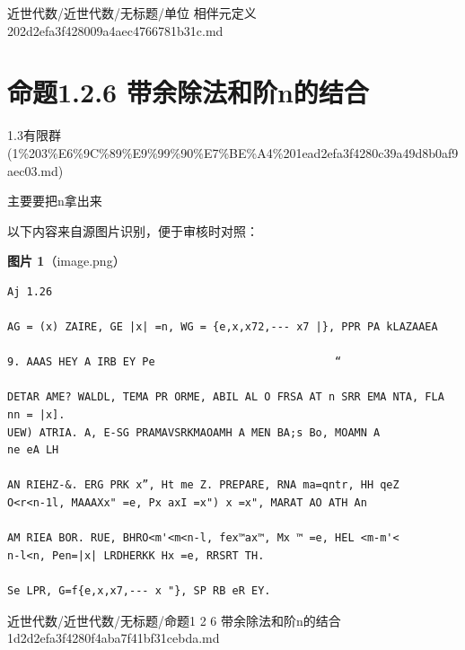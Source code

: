\begin{note}[来源路径]

近世代数/近世代数/无标题/单位 相伴元定义 202d2efa3f428009a4aec4766781b31c.md

\end{note}

\section*{命题1.2.6 带余除法和阶n的结合}

\begin{note}[来源上级主题]

1.3有限群 (1\%203\%E6\%9C\%89\%E9\%99\%90\%E7\%BE\%A4\%201ead2efa3f4280c39a49d8b0af9aec03.md)

\end{note}

\begin{proposition}[命题1.2.6 带余除法和阶n的结合]

主要要把n拿出来

\end{proposition}

\begin{note}
以下内容来自源图片识别，便于审核时对照：

\textbf{图片 1}（image.png）
\begin{Verbatim}[fontsize=\small]
Aj 1.26

AG = (x) ZAIRE, GE |x| =n, WG = {e,x,x72,--- x7 |}, PPR PA kLAZAAEA

9. AAAS HEY A IRB EY Pe                            “

DETAR AME? WALDL, TEMA PR ORME, ABIL AL O FRSA AT n SRR EMA NTA, FLA nn = |x].
UEW) ATRIA. A, E-SG PRAMAVSRKMAOAMH A MEN BA;s Bo, MOAMN A
ne eA LH

AN RIEHZ-&. ERG PRK x”, Ht me Z. PREPARE, RNA ma=qntr, HH qeZ
O<r<n-1l, MAAAXx" =e, Px axI =x") x =x", MARAT AO ATH An

AM RIEA BOR. RUE, BHRO<m'<m<n-l, fex™ax™, Mx ™ =e, HEL <m-m'<
n-l<n, Pen=|x| LRDHERKK Hx =e, RRSRT TH.

Se LPR, G=f{e,x,x7,--- x "}, SP RB eR EY.
\end{Verbatim}

\end{note}

\begin{note}[来源路径]

近世代数/近世代数/无标题/命题1 2 6 带余除法和阶n的结合 1d2d2efa3f4280f4aba7f41bf31cebda.md

\end{note}

